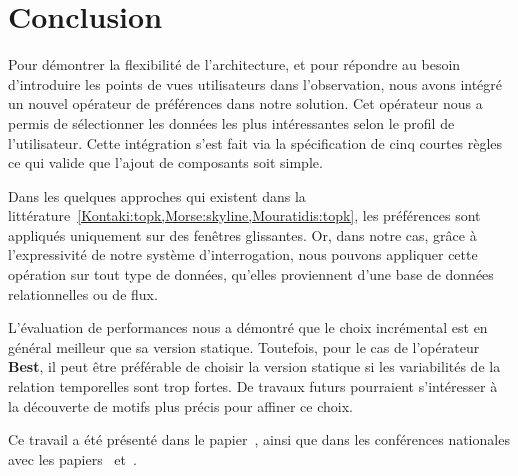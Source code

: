 \section{Conclusion}
Pour démontrer la flexibilité de l'architecture, et pour répondre au besoin d'introduire les points de vues utilisateurs dans l'observation, nous avons intégré un nouvel opérateur de préférences dans notre solution. Cet opérateur nous a permis de sélectionner les données les plus intéressantes selon le profil de l'utilisateur. Cette intégration s'est fait via la spécification de cinq courtes règles ce qui valide que l'ajout de composants soit simple.

Dans les quelques approches qui existent dans la littérature~\ref{Kontaki:topk,Morse:skyline,Mouratidis:topk}, les préférences sont appliqués uniquement sur des fenêtres glissantes. Or, dans notre cas, grâce à l'expressivité de notre système d'interrogation, nous pouvons appliquer cette opération sur tout type de données, qu'elles proviennent d'une base de données relationnelles ou de flux.

L'évaluation de performances nous a démontré que le choix incrémental est en général meilleur que sa version statique. Toutefois, pour le cas de l'opérateur \textbf{Best}, il peut être préférable de choisir la version statique si les variabilités de la relation temporelles sont trop fortes. De travaux futurs pourraient s'intéresser à la découverte de motifs plus précis pour affiner ce choix.

Ce travail a été présenté dans le papier~\cite{Petit:topk}, ainsi que dans les conférences nationales avec les papiers~\cite{Roncancio:pref} et~\cite{Petit:topkbda}.